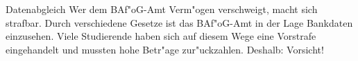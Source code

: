 \vspace{-0.2cm}
\begin{artikel}{Datenabgleich}
\vspace{-0.2cm}
Wer dem BAf"oG-Amt Verm"ogen verschweigt, macht sich strafbar. Durch verschiedene Gesetze ist das BAf"oG-Amt in der Lage Bankdaten einzusehen. Viele Studierende haben sich auf diesem Wege eine Vorstrafe eingehandelt und mussten hohe Betr"age zur"uckzahlen. Deshalb: Vorsicht!
\end{artikel}
